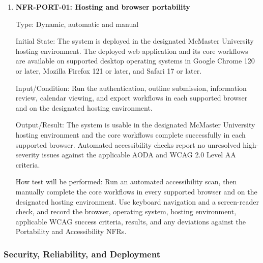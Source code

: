 \documentclass[12pt, titlepage]{article}
\begin{document}
\begin{enumerate}
\item{\label{NFR-PORT-01}\textbf{NFR-PORT-01: Hosting and browser portability}\\}

Type: Dynamic, automatic and manual

Initial State: The system is deployed in the designated McMaster University
hosting environment. The deployed web application and its core workflows are
available on supported desktop operating systems in Google Chrome 120 or
later, Mozilla Firefox 121 or later, and Safari 17 or later.

Input/Condition: Run the authentication, outline submission, information
review, calendar viewing, and export workflows in each supported browser and
on the designated hosting environment.

Output/Result: The system is usable in the designated McMaster University
hosting environment and the core workflows complete successfully in each
supported browser. Automated accessibility checks report no unresolved
high-severity issues against the applicable AODA and WCAG 2.0 Level AA
criteria.

How test will be performed: Run an automated accessibility scan, then
manually complete the core workflows in every supported browser and on the
designated hosting environment. Use keyboard navigation and a screen-reader
check, and record the browser, operating system, hosting environment,
applicable WCAG success criteria, results, and any deviations against the
Portability and Accessibility NFRs.

\end{enumerate}

\subsubsection{Security, Reliability, and Deployment}
\end{document}
